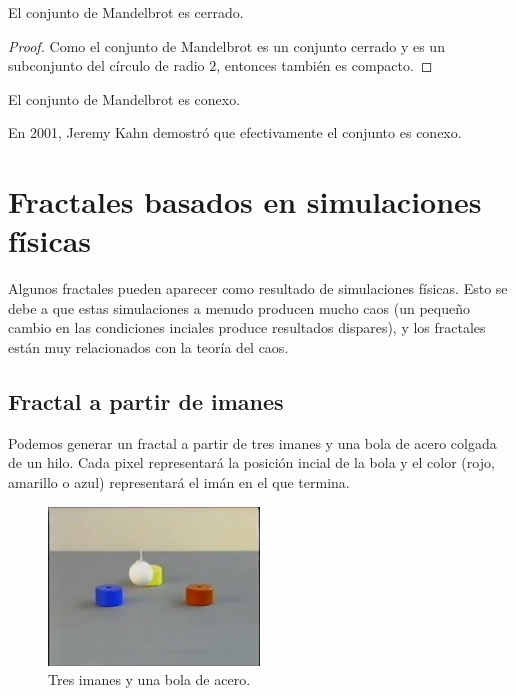 \begin{lemma}
    El conjunto de Mandelbrot es cerrado.
\end{lemma}

\begin{proof}
    Como el conjunto de Mandelbrot es un conjunto cerrado y es un subconjunto del círculo de radio $2$, entonces también es compacto.
\end{proof}

\begin{theorem}
    El conjunto de Mandelbrot es conexo. \cite{Wikipedia_Mandelbrot}
\end{theorem}

\noindent En 2001, Jeremy Kahn demostró que efectivamente el conjunto es conexo. 

\section{Fractales basados en simulaciones físicas}

\noindent Algunos fractales pueden aparecer como resultado de simulaciones físicas. Esto se debe a que estas simulaciones a menudo producen mucho caos (un pequeño cambio en las condiciones inciales produce resultados dispares), y los fractales están muy relacionados con la teoría del caos.\cite{youtube-2016}\\

\subsection{Fractal a partir de imanes}

\noindent Podemos generar un fractal a partir de tres imanes y una bola de acero colgada de un hilo. Cada pixel representará la posición incial de la bola y el color (rojo, amarillo o azul) representará el imán en el que termina.\\

\begin{figure}[H]
    \centering
    \includegraphics[width=0.5\textwidth]{figures/magnets.jpg}
    \caption{Tres imanes y una bola de acero.}
    \label{fig:magnets}
\end{figure}

